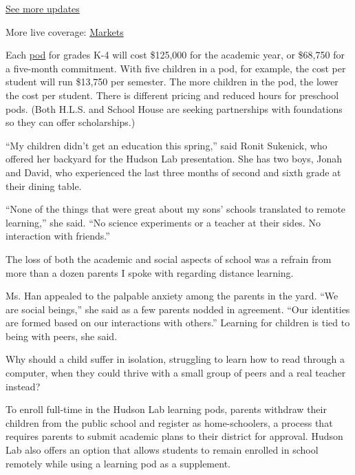 \href{https://www.nytimes3xbfgragh.onion/2020/08/01/world/coronavirus-covid-19.html?action=click\&pgtype=Article\&state=default\&region=MAIN_CONTENT_1\&context=storylines_live_updates}{See
more updates}

More live coverage:
\href{https://www.nytimes3xbfgragh.onion/live/2020/07/31/business/stock-market-today-coronavirus?action=click\&pgtype=Article\&state=default\&region=MAIN_CONTENT_1\&context=storylines_live_updates}{Markets}

Each \href{https://www.learning-pods.com/}{pod} for grades K-4 will cost
\$125,000 for the academic year, or \$68,750 for a five-month
commitment. With five children in a pod, for example, the cost per
student will run \$13,750 per semester. The more children in the pod,
the lower the cost per student. There is different pricing and reduced
hours for preschool pods. (Both H.L.S. and School House are seeking
partnerships with foundations so they can offer scholarships.)

``My children didn't get an education this spring,'' said Ronit
Sukenick, who offered her backyard for the Hudson Lab presentation. She
has two boys, Jonah and David, who experienced the last three months of
second and sixth grade at their dining table.

``None of the things that were great about my sons' schools translated
to remote learning,'' she said. ``No science experiments or a teacher at
their sides. No interaction with friends.''

The loss of both the academic and social aspects of school was a refrain
from more than a dozen parents I spoke with regarding distance learning.

Ms. Han appealed to the palpable anxiety among the parents in the yard.
``We are social beings,'' she said as a few parents nodded in agreement.
``Our identities are formed based on our interactions with others.''
Learning for children is tied to being with peers, she said.

Why should a child suffer in isolation, struggling to learn how to read
through a computer, when they could thrive with a small group of peers
and a real teacher instead?

To enroll full-time in the Hudson Lab learning pods, parents withdraw
their children from the public school and register as home-schoolers, a
process that requires parents to submit academic plans to their district
for approval. Hudson Lab also offers an option that allows students to
remain enrolled in school remotely while using a learning pod as a
supplement.

